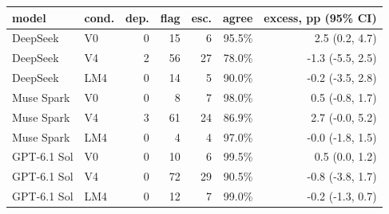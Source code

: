 \begin{tabular}{llrrrrr}
\toprule
model & cond. & dep. & flag & esc. & agree & excess, pp (95\% CI) \\
\midrule
DeepSeek & V0 & 0 & 15 & 6 & 95.5\% & 2.5 (0.2, 4.7) \\
DeepSeek & V4 & 2 & 56 & 27 & 78.0\% & -1.3 (-5.5, 2.5) \\
DeepSeek & LM4 & 0 & 14 & 5 & 90.0\% & -0.2 (-3.5, 2.8) \\
Muse Spark & V0 & 0 & 8 & 7 & 98.0\% & 0.5 (-0.8, 1.7) \\
Muse Spark & V4 & 3 & 61 & 24 & 86.9\% & 2.7 (-0.0, 5.2) \\
Muse Spark & LM4 & 0 & 4 & 4 & 97.0\% & -0.0 (-1.8, 1.5) \\
GPT-6.1 Sol & V0 & 0 & 10 & 6 & 99.5\% & 0.5 (0.0, 1.2) \\
GPT-6.1 Sol & V4 & 0 & 72 & 29 & 90.5\% & -0.8 (-3.8, 1.7) \\
GPT-6.1 Sol & LM4 & 0 & 12 & 7 & 99.0\% & -0.2 (-1.3, 0.7) \\
\bottomrule
\end{tabular}

